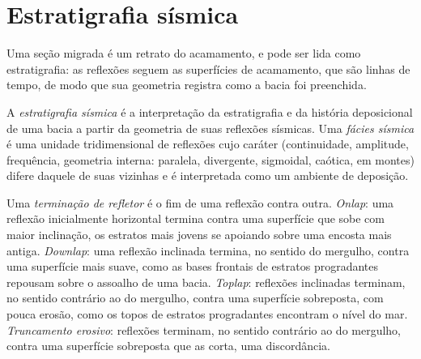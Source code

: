 \section{Estratigrafia sísmica}

Uma seção migrada é um retrato do acamamento, e pode ser lida como
estratigrafia: as reflexões seguem as superfícies de acamamento, que são
linhas de tempo, de modo que sua geometria registra como a bacia foi preenchida.

\begin{definition}\label{def:b3:exploration-seismology:seismic-stratigraphy}
A \emph{estratigrafia sísmica} é a interpretação
da estratigrafia e da história deposicional de uma bacia a partir da geometria
de suas reflexões sísmicas. Uma \emph{fácies sísmica} é uma
unidade tridimensional de reflexões cujo caráter (continuidade, amplitude,
frequência, geometria interna: paralela, divergente, sigmoidal, caótica, em montes)
difere daquele de suas vizinhas e é interpretada como um
ambiente de deposição.
\end{definition}

\begin{definition}\label{def:b3:exploration-seismology:terminations}
Uma \emph{terminação de refletor} é o fim de uma
reflexão contra outra. \emph{Onlap}: uma reflexão inicialmente
horizontal termina contra uma superfície que sobe com maior inclinação, os
estratos mais jovens se apoiando sobre uma encosta mais antiga. \emph{Downlap}: uma reflexão inclinada
termina, no sentido do mergulho, contra uma superfície mais suave, como as
bases frontais de estratos progradantes repousam sobre o assoalho de uma bacia. \emph{Toplap}: reflexões inclinadas
terminam, no sentido contrário ao do mergulho, contra uma superfície sobreposta, com pouca erosão, como
os topos de estratos progradantes encontram o nível do mar. \emph{Truncamento
erosivo}: reflexões terminam, no sentido contrário ao do mergulho, contra uma
superfície sobreposta que as corta, uma discordância.
\end{definition}

